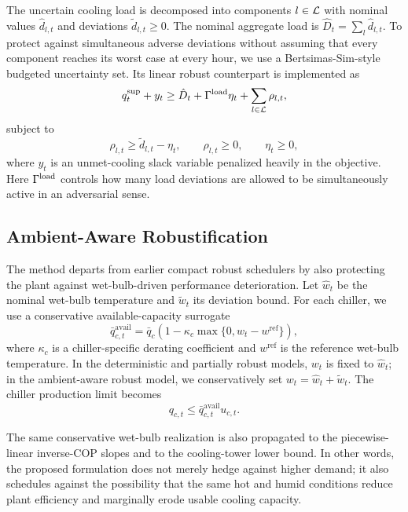 The uncertain cooling load is decomposed into components $l \in \mathcal{L}$ with nominal values $\hat{d}_{l,t}$ and deviations $\tilde{d}_{l,t} \ge 0$. The nominal aggregate load is $\hat{D}_t = \sum_l \hat{d}_{l,t}$. To protect against simultaneous adverse deviations without assuming that every component reaches its worst case at every hour, we use a Bertsimas-Sim-style budgeted uncertainty set. Its linear robust counterpart is implemented as
\begin{equation}
q^{\mathrm{sup}}_t + y_t \ge \hat{D}_t + \Gamma^{\mathrm{load}} \eta_t + \sum_{l \in \mathcal{L}} \rho_{l,t},
\end{equation}
subject to
\begin{equation}
\rho_{l,t} \ge \tilde{d}_{l,t} - \eta_t, \qquad \rho_{l,t} \ge 0, \qquad \eta_t \ge 0,
\end{equation}
where $y_t$ is an unmet-cooling slack variable penalized heavily in the objective. Here $\Gamma^{\mathrm{load}}$ controls how many load deviations are allowed to be simultaneously active in an adversarial sense.

\subsection{Ambient-Aware Robustification}

The method departs from earlier compact robust schedulers by also protecting the plant against wet-bulb-driven performance deterioration. Let $\hat{w}_t$ be the nominal wet-bulb temperature and $\tilde{w}_t$ its deviation bound. For each chiller, we use a conservative available-capacity surrogate
\begin{equation}
\bar{q}_{c,t}^{\mathrm{avail}} = \bar{q}_{c} \left( 1 - \kappa_c \max\{0, w_t - w^{\mathrm{ref}}\} \right),
\end{equation}
where $\kappa_c$ is a chiller-specific derating coefficient and $w^{\mathrm{ref}}$ is the reference wet-bulb temperature. In the deterministic and partially robust models, $w_t$ is fixed to $\hat{w}_t$; in the ambient-aware robust model, we conservatively set $w_t = \hat{w}_t + \tilde{w}_t$. The chiller production limit becomes
\begin{equation}
q_{c,t} \le \bar{q}_{c,t}^{\mathrm{avail}} u_{c,t}.
\end{equation}

The same conservative wet-bulb realization is also propagated to the piecewise-linear inverse-COP slopes and to the cooling-tower lower bound. In other words, the proposed formulation does not merely hedge against higher demand; it also schedules against the possibility that the same hot and humid conditions reduce plant efficiency and marginally erode usable cooling capacity.

